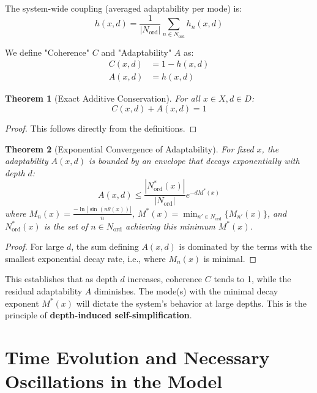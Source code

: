 \documentclass[11pt,a4paper]{article}
\newtheorem{theorem}{Theorem}[section]
\begin{document}
The system-wide coupling (averaged adaptability per mode) is:
\begin{equation}
    h(x,d) = \frac{1}{|N_{\text{ord}}|} \sum_{n \in N_{\text{ord}}} h_n(x,d)
\end{equation}

We define "Coherence" $C$ and "Adaptability" $A$ as:
\begin{align}
    C(x,d) &= 1 - h(x,d) \\
    A(x,d) &= h(x,d)
\end{align}

\begin{theorem}[Exact Additive Conservation]
For all $x \in X, d \in D$:
\begin{equation}
    C(x,d) + A(x,d) = 1
\end{equation}
\end{theorem}

\begin{proof}
This follows directly from the definitions.
\end{proof}

\begin{theorem}[Exponential Convergence of Adaptability]
For fixed $x$, the adaptability $A(x,d)$ is bounded by an envelope that decays exponentially with depth $d$:
\begin{equation}
    A(x,d) \leq \frac{|N_{\text{ord}}^*(x)|}{|N_{\text{ord}}|} e^{-d M^*(x)}
\end{equation}
where $M_n(x) = \frac{-\ln|\sin(n\theta(x))|}{n}$, $M^*(x) = \min_{n' \in N_{\text{ord}}} \{M_{n'}(x)\}$, and $N_{\text{ord}}^*(x)$ is the set of $n \in N_{\text{ord}}$ achieving this minimum $M^*(x)$.
\end{theorem}

\begin{proof}
For large $d$, the sum defining $A(x,d)$ is dominated by the terms with the smallest exponential decay rate, i.e., where $M_n(x)$ is minimal.
\end{proof}

This establishes that as depth $d$ increases, coherence $C$ tends to 1, while the residual adaptability $A$ diminishes. The mode(s) with the minimal decay exponent $M^*(x)$ will dictate the system's behavior at large depths. This is the principle of \textbf{depth-induced self-simplification}.

\section{Time Evolution and Necessary Oscillations in the Model}
\end{document}
